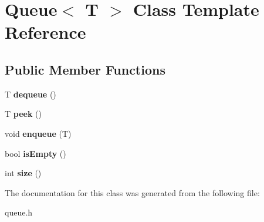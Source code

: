 \hypertarget{classQueue}{}\section{Queue$<$ T $>$ Class Template Reference}
\label{classQueue}
\subsection*{Public Member Functions}
\begin{DoxyCompactItemize}
\item 
T {\bfseries dequeue} ()\hypertarget{classQueue_a036f122e9bf968c80ccd73b9d38017c0}{}\label{classQueue_a036f122e9bf968c80ccd73b9d38017c0}

\item 
T {\bfseries peek} ()\hypertarget{classQueue_a62b36398e72d7b59b559262143aa4a04}{}\label{classQueue_a62b36398e72d7b59b559262143aa4a04}

\item 
void {\bfseries enqueue} (T)\hypertarget{classQueue_a011d990957da9f9ab6de8956f7d839ea}{}\label{classQueue_a011d990957da9f9ab6de8956f7d839ea}

\item 
bool {\bfseries is\+Empty} ()\hypertarget{classQueue_a515bd72c9d7d2bc12add78c0d2e79762}{}\label{classQueue_a515bd72c9d7d2bc12add78c0d2e79762}

\item 
int {\bfseries size} ()\hypertarget{classQueue_a67d5e094f07f44dcadd6811f69d18690}{}\label{classQueue_a67d5e094f07f44dcadd6811f69d18690}

\end{DoxyCompactItemize}


The documentation for this class was generated from the following file\+:\begin{DoxyCompactItemize}
\item 
queue.\+h\end{DoxyCompactItemize}
